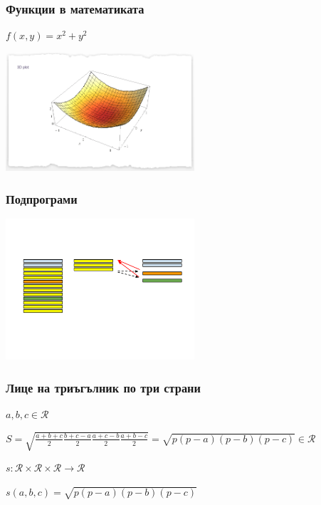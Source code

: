 \documentclass{beamer}
\begin{document}
\begin{frame}[fragile]
\frametitle{Функции в математиката}

$f(x,y) = x^2+y^2$

\begin{center}
\includegraphics[width=7cm]{images/paraboloid}  
\end{center}

\end{frame}




\begin{frame}[fragile]
\frametitle{Подпрограми}

\begin{center}
\includegraphics[width=7cm]{images/subprog}  
\end{center}


\end{frame}



\begin{frame}[fragile]
\frametitle{Лице на триъгълник по три страни}

\begin{flushleft}
$a,b,c \in \mathcal{R}$

$S = \sqrt{\frac{a+b+c}{2}\frac{b+c-a}{2}\frac{a+c-b}{2}\frac{a+b-c}{2}}=\sqrt{p(p-a)(p-b)(p-c)} \in \mathcal{R}$
\end{flushleft}

\pause

$s:\mathcal{R}\times\mathcal{R}\times\mathcal{R} \rightarrow \mathcal{R}$

\pause

$s(a,b,c)=\sqrt{p(p-a)(p-b)(p-c)}$


\end{frame}
\end{document}
